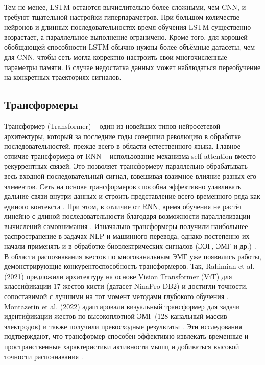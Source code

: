 \documentclass[12pt,a4paper]{article}
\begin{document}
Тем не менее, LSTM остаются вычислительно более сложными, чем CNN, и требуют тщательной настройки гиперпараметров. При большом количестве нейронов и длинных последовательностях время обучения LSTM существенно возрастает, а параллельное выполнение ограничено. Кроме того, для хорошей обобщающей способности LSTM обычно нужны более объёмные датасеты, чем для CNN, чтобы сеть могла корректно настроить свои многочисленные параметры памяти. В случае недостатка данных может наблюдаться переобучение на конкретных траекториях сигналов.


\subsection{Трансформеры}
Трансформер (Transformer) – один из новейших типов нейросетевой архитектуры, который за последние годы совершил революцию в обработке последовательностей, прежде всего в области естественного языка. Главное отличие трансформера от RNN – использование механизма self-attention вместо рекуррентных связей. Это позволяет трансформеру параллельно обрабатывать весь входной последовательный сигнал, взвешивая взаимное влияние разных его элементов. Сеть на основе трансформеров способна эффективно улавливать дальние связи внутри данных и строить представление всего временного ряда как единого контекста \cite{27}. При этом, в отличие от RNN, время обучения не растёт линейно с длиной последовательности благодаря возможности параллелизации вычислений самовнимания \cite{28}.
Изначально трансформеры получили наибольшее распространение в задачах NLP и машинного перевода, однако постепенно их начали применять и в обработке биоэлектрических сигналов (ЭЭГ, ЭМГ и др.) \cite{29}. В области распознавания жестов по многоканальным ЭМГ уже появились работы, демонстрирующие конкурентоспособность трансформеров. Так, Rahimian et al. (2021) предложили архитектуру на основе Vision Transformer (ViT) для классификации 17 жестов кисти (датасет NinaPro DB2) и достигли точности, сопоставимой с лучшими на тот момент методами глубокого обучения \cite{30}. Montazerin et al. (2022) адаптировали визуальный трансформер для задачи идентификации жестов по высокоплотной ЭМГ (128-канальный массив электродов) и также получили превосходные результаты \cite{31}. Эти исследования подтверждают, что трансформер способен эффективно извлекать временные и пространственные характеристики активности мышц и добиваться высокой точности распознавания \cite{32}.
\end{document}
